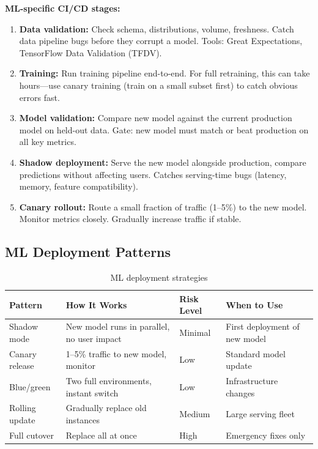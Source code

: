 \textbf{ML-specific CI/CD stages:}
\begin{enumerate}
    \item \textbf{Data validation:} Check schema, distributions, volume, freshness. Catch data pipeline bugs before they corrupt a model. Tools: Great Expectations, TensorFlow Data Validation (TFDV).
    \item \textbf{Training:} Run training pipeline end-to-end. For full retraining, this can take hours---use canary training (train on a small subset first) to catch obvious errors fast.
    \item \textbf{Model validation:} Compare new model against the current production model on held-out data. Gate: new model must match or beat production on all key metrics.
    \item \textbf{Shadow deployment:} Serve the new model alongside production, compare predictions without affecting users. Catches serving-time bugs (latency, memory, feature compatibility).
    \item \textbf{Canary rollout:} Route a small fraction of traffic (1--5\%) to the new model. Monitor metrics closely. Gradually increase traffic if stable.
\end{enumerate}

\subsection{ML Deployment Patterns}

\begin{table}[H]
\centering
\caption{ML deployment strategies}
\begin{tabularx}{\textwidth}{lXXl}
\toprule
\textbf{Pattern} & \textbf{How It Works} & \textbf{Risk Level} & \textbf{When to Use} \\
\midrule
Shadow mode & New model runs in parallel, no user impact & Minimal & First deployment of new model \\
Canary release & 1--5\% traffic to new model, monitor & Low & Standard model update \\
Blue/green & Two full environments, instant switch & Low & Infrastructure changes \\
Rolling update & Gradually replace old instances & Medium & Large serving fleet \\
Full cutover & Replace all at once & High & Emergency fixes only \\
\bottomrule
\end{tabularx}
\end{table}

